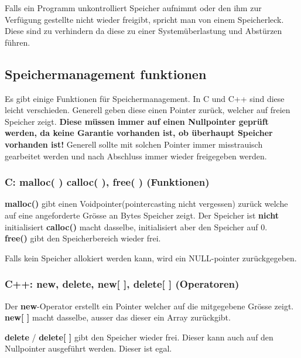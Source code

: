 Falls ein Programm unkontrolliert Speicher aufnimmt oder den ihm zur Verfügung gestellte nicht wieder freigibt, spricht man von einem Speicherleck. 
Diese sind zu verhindern da diese zu einer Systemüberlastung und Abstürzen führen.


\subsection{Speichermanagement funktionen}

Es gibt einige Funktionen für Speichermanagement. In C und C++ sind diese leicht verschieden. 
Generell geben diese einen Pointer zurück, welcher auf freien Speicher zeigt. 
\textbf{Diese müssen immer auf einen Nullpointer geprüft werden, da keine Garantie vorhanden ist, ob überhaupt Speicher vorhanden ist!}
Generell sollte mit solchen Pointer immer misstrauisch gearbeitet werden und nach Abschluss immer wieder freigegeben werden.

\subsubsection{C: malloc( ) calloc( ), free( ) (Funktionen)}

\textbf{malloc()} gibt einen Voidpointer(pointercasting nicht vergessen) zurück welche auf eine angeforderte Grösse an Bytes Speicher zeigt. 
Der Speicher ist \textbf{nicht} initialisiert
\textbf{calloc()} macht dasselbe, initialisiert aber den Speicher auf 0.\\
\textbf{free()} gibt den Speicherbereich wieder frei.



Falls kein Speicher allokiert werden kann, wird ein NULL-pointer zurückgegeben.

\subsubsection{C++: new, delete, new[ ], delete[ ] (Operatoren)}

Der \textbf{new}-Operator erstellt ein Pointer welcher auf die mitgegebene Grösse zeigt.
\textbf{new[ ]} macht dasselbe, ausser das dieser ein Array zurückgibt.

\textbf{delete} / \textbf{delete[ ]} gibt den Speicher wieder frei. 
Dieser kann auch auf den Nullpointer ausgeführt werden. 
Dieser ist  egal.



